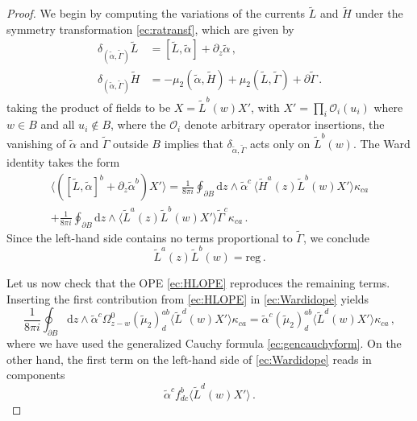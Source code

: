 \documentclass[11pt]{amsart}
\newcommand{\tL}{{\tilde L}}
\newcommand{\ta}{{\tilde \alpha}}
\newcommand{\tg}{{\tilde \Gamma}}
\newcommand{\tH}{{\tilde H}}
\numberwithin{equation}{section}
\numberwithin{figure}{section}
\numberwithin{table}{section}
\renewcommand{\d}{\mathrm{d}}
\theoremstyle{thm}
\numberwithin{equation}{subsection}
\theoremstyle{definition}
\theoremstyle{rem}
\begin{document}
\begin{proof}
   We begin by computing the variations of the currents $\tL$ and $\tH$ under the symmetry transformation \eqref{ec:ratransf}, which are given by
    \begin{align}
    \delta_{(\tilde \alpha, \tilde \Gamma)} \tilde{L} &= [\tilde L, \ta] + \partial_z \tilde \alpha \,, \\
    \delta_{(\tilde \alpha, \tilde \Gamma)} \tilde{H} &= -\mu_2(\tilde \alpha, \tilde{H}) + \mu_2(\tilde{L}, \tilde \Gamma) + \partial \tilde \Gamma \,.
\end{align}
taking the product of fields to be $X = \tL^b(w)X'$, with 
$X'=\prod_i \mathcal O_i(u_i)$ where $w \in B$ and all $u_i \notin B$, where the $\mathcal O_i$ denote arbitrary operator insertions, the vanishing of $\ta$ and $\tg$ outside $B$ implies that $\delta_{\ta,\tg}$ acts only on $\tL^b(w)$. The Ward identity takes the form
\begin{multline}
\label{ec:Wardidope}
    \langle ([\tilde L,\ta]^b+\partial_z\tilde\alpha^b)X'\rangle
    =\frac{1}{8\pi i}\oint_{\partial B}\d z\wedge \ta^c\,
        \langle \tH^a(z)\tL^b(w)X'\rangle \kappa_{ca} \\
    +\frac{1}{8\pi i}\oint_{\partial B}\d z\wedge 
        \langle \tL^a(z)\tL^b(w)X'\rangle \tg^c \kappa_{ca}\,.
\end{multline}
Since the left-hand side contains no terms proportional to $\tg$, we conclude
\begin{equation}
    \tL^a(z)\tL^b(w)=\mathrm{reg}\,.
\end{equation}

Let us now check that the OPE \eqref{ec:HLOPE} reproduces the remaining terms. Inserting the first contribution from \eqref{ec:HLOPE} in \eqref{ec:Wardidope} yields
\begin{equation}
\label{ec:OPEterm1a}
    \frac{1}{8\pi i}\oint_{\partial B}\d z\wedge \ta^c \Omega_{z-w}^0 
        (\tilde\mu_2)^{ab}_d \langle \tL^d(w)X'\rangle \kappa_{ca}
    =\ta^c(\tilde\mu_2)^{ab}_d \langle \tL^d(w)X'\rangle \kappa_{ca}\,,
\end{equation}
where we have used the generalized Cauchy formula \eqref{ec:gencauchyform}.  
On the other hand, the first term on the left-hand side of 
\eqref{ec:Wardidope} reads in components
\begin{equation}
\label{ec:OPEterm1b}
    \ta^c f^{b}_{dc}\langle \tL^d(w)X'\rangle\,.
\end{equation}


\end{proof}
\end{document}
